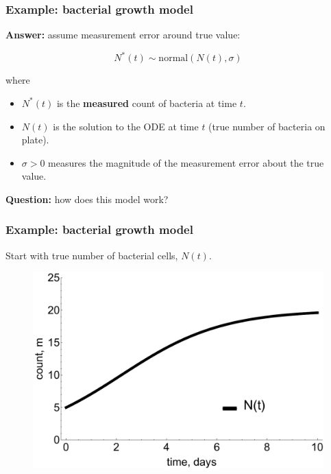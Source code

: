 \documentclass[handout]{beamer}
\begin{document}
\begin{frame}
	\frametitle{Example: bacterial growth model}
	\textbf{Answer:} assume measurement error around true value:
	
	\begin{equation}
	N^*(t) \sim \text{normal}(N(t), \sigma)
	\end{equation}
	
	where
	\begin{itemize}
		\item<5-> $N^*(t)$ is the \textbf{measured} count of bacteria at time $t$.
		\item<6-> $N(t)$ is the solution to the ODE at time $t$ (true number of bacteria on plate).
		\item<7-> $\sigma>0$ measures the magnitude of the measurement error about the true value.
	\end{itemize}
	
	 \textbf{Question:} how does this model work?
	
\end{frame}

\begin{frame}
	\frametitle{Example: bacterial growth model}
	Start with true number of bacterial cells, $N(t)$.
	
	\begin{figure}[ht]
		\centerline{\includegraphics[width=1\textwidth]{./Figures/lec7_odeSingleBulding1.pdf}}
	\end{figure}
	
\end{frame}
\end{document}
